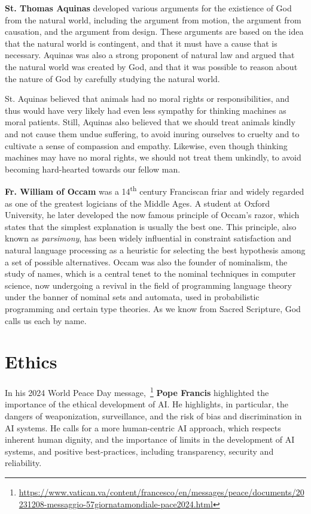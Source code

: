 \documentclass[sigplan,nonacm]{acmart}\settopmatter{printfolios=false,printccs=false,printacmref=false}
\begin{document}
  \textbf{St. Thomas Aquinas} developed various arguments for the existience of God from the natural world, including the argument from motion, the argument from causation, and the argument from design. These arguments are based on the idea that the natural world is contingent, and that it must have a cause that is necessary. Aquinas was also a strong proponent of natural law and argued that the natural world was created by God, and that it was possible to reason about the nature of God by carefully studying the natural world.

  St. Aquinas believed that animals had no moral rights or responsibilities, and thus would have very likely had even less sympathy for thinking machines as moral patients. Still, Aquinas also believed that we should treat animals kindly and not cause them undue suffering, to avoid inuring ourselves to cruelty and to cultivate a sense of compassion and empathy. Likewise, even though thinking machines may have no moral rights, we should not treat them unkindly, to avoid becoming hard-hearted towards our fellow man.

  \textbf{Fr. William of Occam} was a 14\textsuperscript{th} century Franciscan friar and widely regarded as one of the greatest logicians of the Middle Ages. A student at Oxford University, he later developed the now famous principle of Occam's razor, which states that the simplest explanation is usually the best one. This principle, also known as \textit{parsimony}, has been widely influential in constraint satisfaction and natural language processing as a heuristic for selecting the best hypothesis among a set of possible alternatives. Occam was also the founder of nominalism, the study of names, which is a central tenet to the nominal techniques in computer science, now undergoing a revival in the field of programming language theory under the banner of nominal sets and automata, used in probabilistic programming and certain type theories. As we know from Sacred Scripture, God calls us each by name.

  \section{Ethics}

  In his 2024 World Peace Day message,~\footnote{\url{https://www.vatican.va/content/francesco/en/messages/peace/documents/20231208-messaggio-57giornatamondiale-pace2024.html}} \textbf{Pope Francis} highlighted the importance of the ethical development of AI. He highlights, in particular, the dangers of weaponization, surveillance, and the risk of bias and discrimination in AI systems. He calls for a more human-centric AI approach, which respects inherent human dignity, and the importance of limits in the development of AI systems, and positive best-practices, including transparency, security and reliability.
\end{document}
